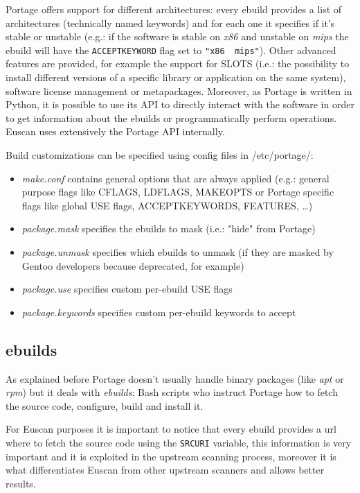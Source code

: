 Portage offers support for different architectures: every ebuild provides a list of architectures (technically named keywords) and for each one it specifies if it’s stable or unstable (e.g.: if the software is stable on \emph{x86} and unstable on \emph{mips} the ebuild will have the \texttt{ACCEPT\textunderscore KEYWORD} flag set to \texttt{"x86 ~mips"}). 
Other advanced features are provided, for example the support for SLOTS (i.e.: the possibility to install different versions of a specific library or application on the same system), software license management or metapackages.
Moreover, as Portage is written in Python, it is possible to use its API to directly interact with the software in order to get information about the ebuilds or programmatically perform operations. Euscan uses extensively the Portage API internally.

\vspace{0.5cm}

Build customizations can be specified using config files in /etc/portage/:
\begin{itemize}
\item \emph{make.conf} contains general options that are always applied (e.g.: general  purpose flags like CFLAGS, LDFLAGS, MAKEOPTS or Portage specific flags like global USE flags, ACCEPT\textunderscore KEYWORDS, FEATURES, \ldots)
\item \emph{package.mask} specifies the ebuilds to mask (i.e.: "hide" from Portage)
\item \emph{package.unmask} specifies which ebuilds to unmask (if they are masked by Gentoo developers because deprecated, for example)
\item \emph{package.use} specifies custom per-ebuild USE flags
\item \emph{package.keywords} specifies custom per-ebuild keywords to accept
\end{itemize}


\subsection{ebuilds}
As explained before Portage doesn't usually handle binary packages (like \emph{apt} or \emph{rpm}) but it deals with \emph{ebuilds}: Bash scripts who instruct Portage how to fetch the source code, configure, build and install it.

For Euscan purposes it is important to notice that every ebuild provides a url where to fetch the source code using the \texttt{SRC\textunderscore URI} variable, this information is very important and it is exploited in the upstream scanning process, moreover it is what differentiates Euscan from other upstream scanners and allows better results.

